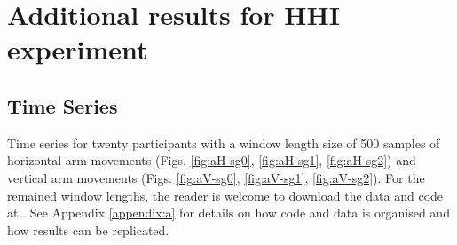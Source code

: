 \chapter{Additional results for HHI experiment} \label{appendix:f}

\graphicspath{{figs/appendixF/PDF/}}

\section{Time Series} \label{appendix:f:ts}

Time series for twenty participants with a window length size of 500 samples
of horizontal arm movements (Figs. \ref{fig:aH-sg0}, \ref{fig:aH-sg1}, \ref{fig:aH-sg2})
and vertical arm movements (Figs. \ref{fig:aV-sg0}, \ref{fig:aV-sg1}, \ref{fig:aV-sg2}).
For the remained window lengths, 
the reader is welcome to download the data and code at \cite{xochicale2019}.
See Appendix \ref{appendix:a}
for details on how code and data 
is organised and how results can be replicated. 



